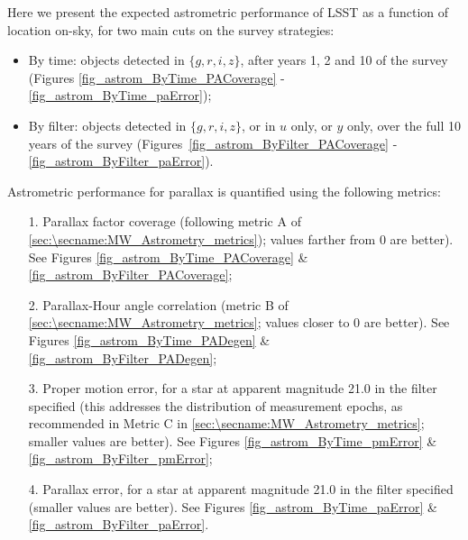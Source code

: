 Here we present the expected astrometric performance of LSST as a function of
location on-sky, for two main cuts on the survey strategies:
\begin{itemize}
  \item By time: objects detected in $\{g,r,i,z\}$, after years 1, 2 and 10
    of the survey (Figures \ref{fig_astrom_ByTime_PACoverage} -
    \ref{fig_astrom_ByTime_paError});
\item By filter: objects detected in $\{g,r,i,z\}$, or in $u$ only, or $y$ only, over the full 10 years of the survey (Figures~\ref{fig_astrom_ByFilter_PACoverage} - \ref{fig_astrom_ByFilter_paError}).
\end{itemize}

Astrometric performance for parallax is quantified using the following
metrics:
\begin{itemize}
  \item[1.] Parallax factor coverage (following metric A of \autoref{sec:\secname:MW_Astrometry_metrics}); values farther from 0 are better). See Figures \ref{fig_astrom_ByTime_PACoverage} \&  \ref{fig_astrom_ByFilter_PACoverage};
    \item[2.] Parallax-Hour angle correlation (metric B of \autoref{sec:\secname:MW_Astrometry_metrics}; values closer to 0 are better). See Figures \ref{fig_astrom_ByTime_PADegen} \& \ref{fig_astrom_ByFilter_PADegen};
      \item[3.] Proper motion error, for a star at apparent magnitude 21.0 in the filter specified (this addresses the distribution of measurement epochs, as recommended in Metric C in \autoref{sec:\secname:MW_Astrometry_metrics}; smaller values are better). See Figures \ref{fig_astrom_ByTime_pmError} \& \ref{fig_astrom_ByFilter_pmError};
        \item[4.] Parallax error, for a star at apparent magnitude 21.0 in the filter specified (smaller values are better). See Figures \ref{fig_astrom_ByTime_paError} \& \ref{fig_astrom_ByFilter_paError}.
\end{itemize}

